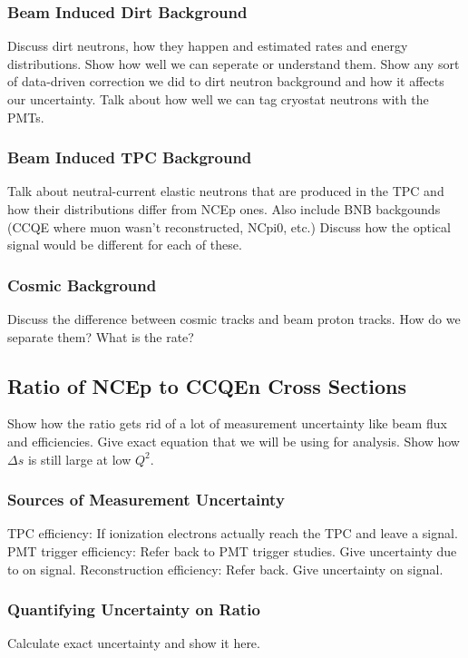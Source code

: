   \subsubsection{Beam Induced Dirt Background}
    Discuss dirt neutrons, how they happen and estimated rates and energy
    distributions.  Show how well we can seperate or understand them. Show any
    sort of data-driven correction we did to dirt neutron background and how it
    affects our uncertainty. Talk about how well we can tag cryostat neutrons
    with the PMTs.
  \subsubsection{Beam Induced TPC Background}
    Talk about neutral-current elastic neutrons that are produced in the TPC
    and how their distributions differ from NCEp ones. Also include BNB
    backgounds (CCQE where muon wasn't reconstructed, NCpi0, etc.) Discuss how
    the optical signal would be different for each of these.
  \subsubsection{Cosmic Background}
    Discuss the difference between cosmic tracks and beam proton tracks. How do
    we separate them? What is the rate?

\subsection{Ratio of NCEp to CCQEn Cross Sections}\label{ratios}
  Show how the ratio gets rid of a lot of measurement uncertainty like beam
  flux and efficiencies. Give exact equation that we will be using for
  analysis. Show how $\Delta s$ is still large at low $Q^2$.
  \subsubsection{Sources of Measurement Uncertainty}
    TPC efficiency: If ionization electrons actually reach the
    TPC and leave a signal.
    PMT trigger efficiency: Refer back to PMT trigger studies. Give uncertainty
    due to on signal.
    Reconstruction efficiency: Refer back. Give uncertainty on signal.
  \subsubsection{Quantifying Uncertainty on Ratio}\label{errorcalc}
    Calculate exact uncertainty and show it here.
